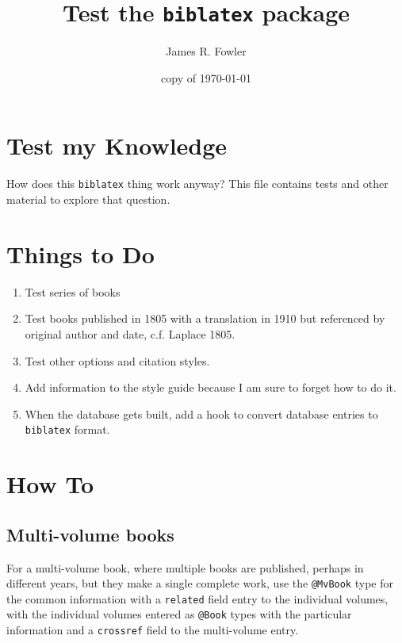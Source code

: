 \documentclass{article}
\begin{document}
\title{Test the {\tt biblatex} package}
\author{James R. Fowler}
\date{copy of \today}
\maketitle


\section{Test my Knowledge}

How does this {\tt biblatex} thing work anyway? This file contains
tests and other material to explore that question.


\section{Things to Do}

\begin{enumerate}
  \item Test series of books

  \item Test books published in 1805 with a translation in 1910
    but referenced by original author and date,
    c.f. Laplace 1805. \cite{Laplace1805}

  \item Test other options and citation styles.

  \item Add information to the style guide because I am sure to forget
    how to do it.

  \item When the database gets built, add a hook to convert database
    entries to {\tt biblatex} format.
\end{enumerate}

\section{How To}

\subsection{Multi-volume books}

For a multi-volume book, where multiple books are published,
perhaps in different years, but they make a single complete work,
use the {\tt @MvBook} type for the common information with a {\tt related}
field entry to the individual volumes, with the individual volumes entered
as {\tt @Book} types with the particular
information and a {\tt crossref} field to the multi-volume entry.
\end{document}
